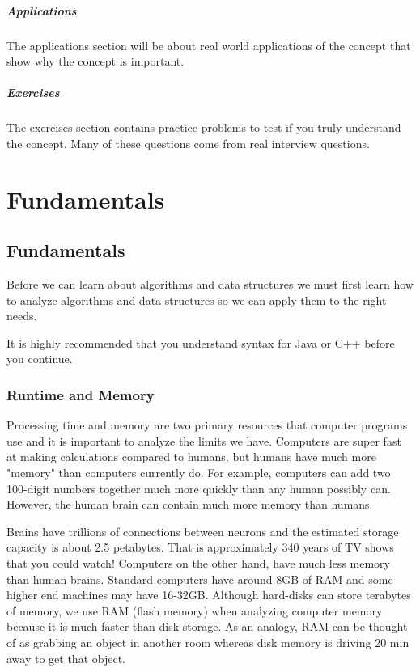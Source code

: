 \documentclass[11pt,oneside]{book}
\begin{document}
\subsubsection{Applications}

The applications section will be about real world applications of the concept that show why the concept is important.

\subsubsection{Exercises}

The exercises section contains practice problems to test if you truly understand the concept. Many of these questions come from real interview questions.

\part{ Fundamentals }
    \chapter{ Fundamentals }
        

Before we can learn about algorithms and data structures we must first learn how to analyze algorithms and data structures so we can apply them to the right needs.

It is highly recommended that you understand syntax for Java or C++ before you continue.


        \section{ Runtime and Memory }
        

Processing time and memory are two primary resources that computer programs use and it is important to analyze the limits we have. Computers are super fast at making calculations compared to humans, but humans have much more "memory" than computers currently do. For example, computers can add two 100-digit numbers together much more quickly than any human possibly can. However, the human brain can contain much more memory than humans.

Brains have trillions of connections between neurons and the estimated storage capacity is about 2.5 petabytes. That is approximately 340 years of TV shows that you could watch! Computers on the other hand, have much less memory than human brains. Standard computers have around 8GB of RAM and some higher end machines may have 16-32GB. Although hard-disks can store terabytes of memory, we use RAM (flash memory) when analyzing computer memory because it is much faster than disk storage. As an analogy, RAM can be thought of as grabbing an object in another room whereas disk memory is driving 20 min away to get that object.
\end{document}
